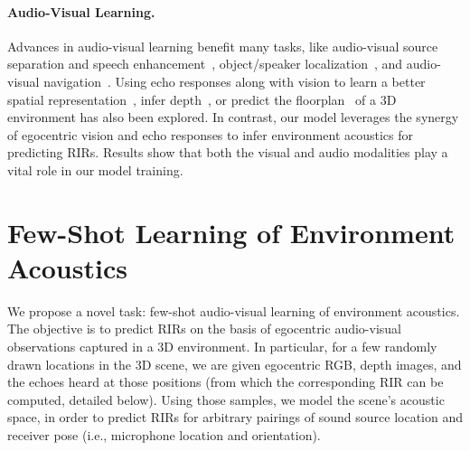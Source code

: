 \paragraph{Audio-Visual Learning.} Advances in audio-visual learning benefit many tasks, like audio-visual source separation and speech enhancement~\citep{afouras2018conversation, afouras2020self, chen2021learning, ephrat2018looking, hou2018audio, michelsanti2021overview, owens2018audio, sadeghi2020audio, zhao2019sound, zhou2019vision, majumder2021move2hear, majumder2022active}, object/speaker localization~\citep{hu2020discriminative, jiang2022egocentric}, and audio-visual navigation~\citep{chen2020soundspaces, DBLP:journals/corr/abs-2008-09622, DBLP:journals/corr/abs-2012-11583, gan2020look, NEURIPS2020_ab6b331e, NEURIPS2020_ab6b331e}. Using echo responses along with vision to learn a better spatial representation~\citep{gao2020visualechoes}, infer depth~\cite{christensen2020batvision}, or predict the floorplan~\citep{purushwalkam2021audio} of a 3D environment has also been explored. In contrast, our model leverages the synergy of egocentric vision and echo responses to infer environment acoustics for predicting RIRs. Results show that both the visual and audio modalities play a vital role in our model training. 

\section{
Few-Shot Learning of Environment Acoustics
}\label{sec:task}

We propose a novel task: few-shot audio-visual learning of environment acoustics. The objective is to predict RIRs on the basis of egocentric audio-visual observations captured in a 3D environment. In particular, for a few randomly drawn locations in the 3D scene, we are given egocentric RGB, depth images, and the echoes heard at those positions (from which the corresponding RIR can be computed, detailed below). Using those samples, we model the scene's acoustic space, in order to predict RIRs for arbitrary pairings of sound source location and receiver pose (i.e., microphone location and orientation). 

